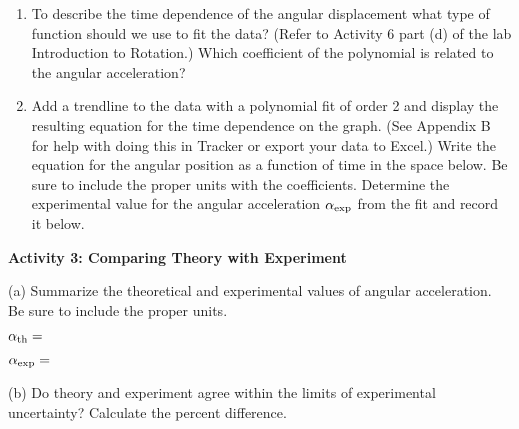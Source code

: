 \begin{enumerate}
\item To describe the time dependence of the angular displacement what type of 
function should we use to fit the data? (Refer to Activity 6 part (d) of the lab Introduction to Rotation.) Which coefficient of the polynomial is related to 
the angular acceleration?
\answerspace{20mm}


\item Add a trendline to the data with a polynomial fit of order 2 and display the resulting equation for the time dependence on the graph. (See Appendix B for help with doing this in Tracker or export your data to Excel.) Write the equation for the angular position as a function of time in the space below. Be sure to include the proper units with the coefficients. Determine the experimental value for the angular acceleration $\alpha _{\rm exp}$ from the fit and record it below. 
\vspace{20mm}

\end{enumerate}


\textbf{Activity 3: Comparing Theory with Experiment }

(a) Summarize the theoretical and experimental values of angular acceleration. 
Be sure to include the proper units.
\vspace{10mm}

\hspace{0.5in}\( \alpha _{\rm th}= \)
\vspace{10mm}

\hspace{0.5in}\( \alpha _{\rm exp}= \) 
\vspace{15mm}

(b) Do theory and experiment agree within the limits of experimental 
uncertainty? Calculate the percent difference.

